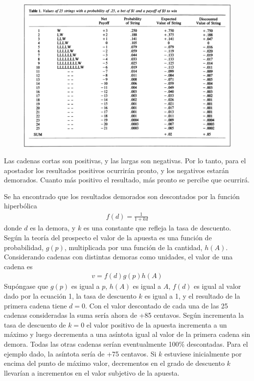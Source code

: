 \documentclass[a4paper,12pt]{article}
\begin{document}
\begin{figure}[!ht]
    \begin{center}
        \includegraphics[scale=0.4]{Rachlin1990(1).png}
    \end{center}
\end{figure}

Las cadenas cortas son positivas, y las largas son negativas. Por lo tanto, para el apostador los resultados positivos ocurrirán pronto, y los negativos estarán demorados. Cuanto más positivo el resultado, más pronto se percibe que ocurrirá.

Se ha encontrado que los resultados demorados son descontados por la función hiperbólica
\begin{eqnarray}
    f(d) = \frac{1}{1 + kd}
\end{eqnarray}
donde $d$ es la demora, y $k$ es una constante que refleja la tasa de descuento. Según la teoría del prospecto el valor de la apuesta es una función de probabilidad, $g(p)$, multiplicada por una función de la cantidad, $h(A)$. Considerando cadenas con distintas demoras como unidades, el valor de una cadena es 
\begin{eqnarray}
    v = f(d)g(p)h(A)
\end{eqnarray}
Supóngase que $g(p)$ es igual a $p$, $h(A)$ es igual a $A$, $f(d)$ es igual al valor dado por la ecuación 1, la tasa de descuento $k$ es igual a 1, y el resultado de la primera cadena tiene $d = 0$. Con el valor descontado de cada una de las 25 cadenas consideradas la suma sería ahora de +85 centavos. Según incrementa la tasa de descuento de $k = 0 $ el valor positivo de la apuesta incrementa a un máximo y luego decrementa a una asíntota igual al valor de la primera cadena sin demora. Todas las otras cadenas serían eventualmente 100\% descontadas. Para el ejemplo dado, la asíntota sería de +75 centavos. Si $k$ estuviese inicialmente por encima del punto de máximo valor, decrementos en el grado de descuento $k$ llevarían a incrementos en el valor subjetivo de la apuesta.
\end{document}
